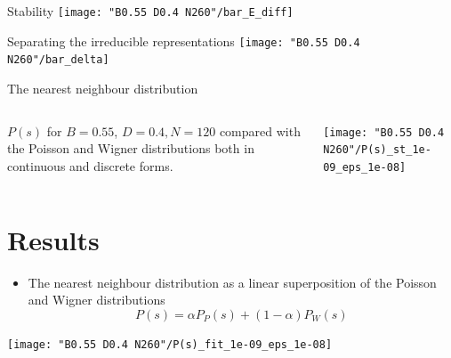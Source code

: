 \documentclass[a4,compress]{beamer}
\begin{document}

\begin{frame}{Stability}
  \centering
  \texttt{[image: "B0.55 D0.4 N260"/bar\_E\_diff]}
\end{frame}


\begin{frame}{Separating the irreducible representations}
  \texttt{[image: "B0.55 D0.4 N260"/bar\_delta]}
\end{frame}


\begin{frame}{The nearest neighbour distribution}
  \begin{columns}[c]
  \begin{column}{0.3\textwidth}
    \(P(s)\) for \(B=0.55\), \({D=0.4, N=120}\) compared with the Poisson
    and Wigner distributions both in continuous and discrete forms.
  \end{column}
  \begin{column}{0.7\textwidth}
    \texttt{[image: "B0.55 D0.4 N260"/P(s)\_st\_1e-09\_eps\_1e-08]}  %
  \end{column}
  \end{columns}
\end{frame}

\section{Results}


\begin{frame}
  \begin{itemize}
    \item The nearest neighbour distribution as a linear superposition
    of the Poisson and Wigner distributions
    \[
      P(s) = \alpha P_P(s) + (1-\alpha) P_W(s)
    \]
  \end{itemize}
\end{frame}


\begin{frame}
  \texttt{[image: "B0.55 D0.4 N260"/P(s)\_fit\_1e-09\_eps\_1e-08]}  %
\end{frame}
\end{document}
